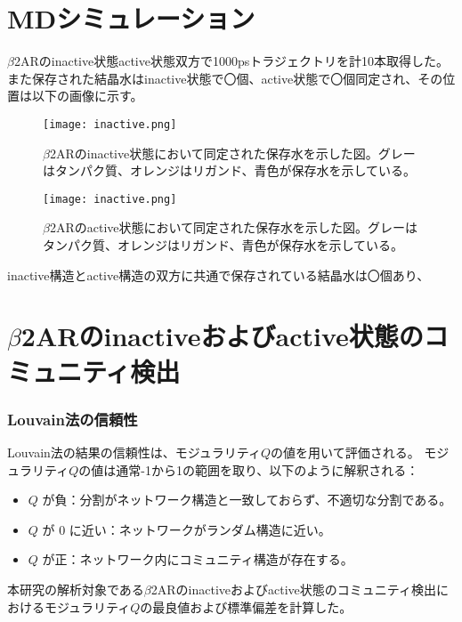 \section{MDシミュレーション}
$\beta$2ARのinactive状態active状態双方で1000psトラジェクトリを計10本取得した。
また保存された結晶水はinactive状態で〇個、active状態で〇個同定され、その位置は以下の画像に示す。
\begin{figure}[htbp]
    \centering
    \texttt{[image: inactive.png]}
    \caption{$\beta$2ARのinactive状態において同定された保存水を示した図。グレーはタンパク質、オレンジはリガンド、青色が保存水を示している。}
    \label{fig:inactive_water}
\end{figure}
\begin{figure}[htbp]
    \centering
    \texttt{[image: inactive.png]}
    \caption{$\beta$2ARのactive状態において同定された保存水を示した図。グレーはタンパク質、オレンジはリガンド、青色が保存水を示している。}
    \label{fig:active_water}
\end{figure}

inactive構造とactive構造の双方に共通で保存されている結晶水は〇個あり、


\section{$\beta$2ARのinactiveおよびactive状態のコミュニティ検出}

\subsubsection{Louvain法の信頼性}

Louvain法の結果の信頼性は、モジュラリティ$Q$の値を用いて評価される。
モジュラリティ$Q$の値は通常-1から1の範囲を取り、以下のように解釈される：

\begin{itemize}
    \item \( Q \) が負：分割がネットワーク構造と一致しておらず、不適切な分割である。
    \item \( Q \) が 0 に近い：ネットワークがランダム構造に近い。
    \item \( Q \) が正：ネットワーク内にコミュニティ構造が存在する。
\end{itemize}

本研究の解析対象である$\beta$2ARのinactiveおよびactive状態のコミュニティ検出におけるモジュラリティ$Q$の最良値および標準偏差を計算した。

